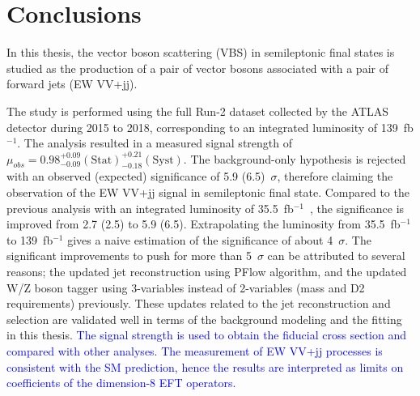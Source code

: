 \chapter{Conclusions}
\label{chap:conclusions}

In this thesis, the vector boson scattering (VBS) in semileptonic final states is studied as the production of a pair of vector bosons associated with a pair of forward jets (EW VV+jj). 

The study is performed using the full Run-2 dataset collected by the ATLAS detector during 2015 to 2018, corresponding to an integrated luminosity of 139~fb$^{-1}$.
The analysis resulted in a measured signal strength of $\mu_{obs} = 0.98^{+ 0.09}_{- 0.09}(\mathrm{Stat})^{+ 0.21}_{- 0.18}(\mathrm{Syst})$.
The background-only hypothesis is rejected with an observed (expected) significance of 5.9 (6.5)~$\sigma$, therefore claiming the observation of the EW VV+jj signal in semileptonic final state. 
Compared to the previous analysis with an integrated luminosity of 35.5~fb$^{-1}$~\cite{STDM-2017-20}, the significance is improved from 2.7 (2.5) to 5.9 (6.5).
Extrapolating the luminosity from 35.5~fb$^{-1}$ to 139~fb$^{-1}$ gives a naive estimation of the significance of about 4~$\sigma$.
The significant improvements to push for more than 5~$\sigma$ can be attributed to several reasons; the updated jet reconstruction using PFlow algorithm, and the updated W/Z boson tagger using 3-variables instead of 2-variables (mass and D2 requirements) previously. 
These updates related to the jet reconstruction and selection are validated well in terms of the background modeling and the fitting in this thesis.
\textcolor{blue}{The signal strength is used to obtain the fiducial cross section and compared with other analyses.
The measurement of EW VV+jj processes is consistent with the SM prediction, hence the results are interpreted as limits on coefficients of the dimension-8 EFT operators.}


